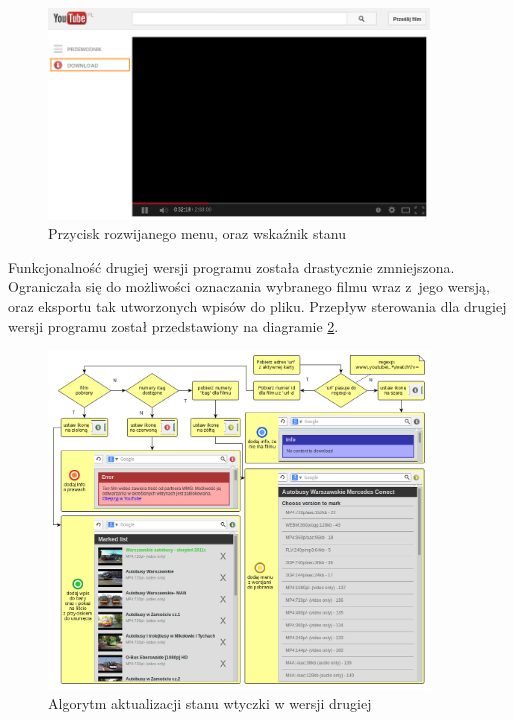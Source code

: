 \begin{figure}[h!]
    \centering
    \includegraphics[width=0.9\textwidth]{img/env_yt_dwn_indicator}
    \caption{Przycisk rozwijanego menu, oraz wskaźnik stanu}
    \label{fig:firefoxplugin1}
\end{figure}

Funkcjonalność drugiej wersji programu została drastycznie zmniejszona.
Ograniczała się do możliwości oznaczania wybranego filmu 
wraz z~jego wersją, oraz
eksportu tak utworzonych wpisów do pliku.
Przepływ sterowania dla drugiej wersji programu został przedstawiony
na diagramie \ref{fig:firefoxpluginflow}.

\begin{figure}[h!]
    \centering
    \includegraphics[width=0.9\textwidth]{img/env_yt_marker}
    \caption{Algorytm aktualizacji stanu wtyczki w wersji drugiej}
    \label{fig:firefoxpluginflow}
\end{figure}


